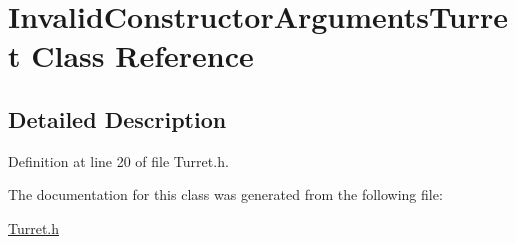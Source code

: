 \hypertarget{class_invalid_constructor_arguments_turret}{\section{Invalid\+Constructor\+Arguments\+Turret Class Reference}
\label{class_invalid_constructor_arguments_turret}
}


\subsection{Detailed Description}


Definition at line 20 of file Turret.\+h.



The documentation for this class was generated from the following file\+:\begin{DoxyCompactItemize}
\item 
\hyperlink{_turret_8h}{Turret.\+h}\end{DoxyCompactItemize}
